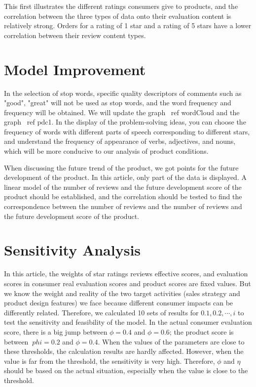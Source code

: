 \documentclass{mcmthesis}
\begin{document}
This first illustrates the different ratings consumers give to products, and the correlation between the three types of data onto their evaluation content is relatively strong. Orders for a rating of 1 star and a rating of 5 stars have a lower correlation between their review content types.
\section{Model Improvement}

In the selection of stop words, specific quality descriptors of comments such as "good", "great" will not be used as stop words, and the word frequency and frequency will be obtained. We will update the graph \ ref {wordCloud} and the graph \ ref {pdc1}. In the display of the problem-solving ideas, you can choose the frequency of words with different parts of speech corresponding to different stars, and understand the frequency of appearance of verbs, adjectives, and nouns, which will be more conducive to our analysis of product conditions.

When discussing the future trend of the product, we got points for the future development of the product. In this article, only part of the data is displayed. A linear model of the number of reviews and the future development score of the product should be established, and the correlation should be tested to find the correspondence between the number of reviews and the number of reviews and the future development score of the product. 

\section{Sensitivity Analysis}

In this article, the weights of star ratings reviews effective scores, and evaluation scores in consumer real evaluation scores and product scores are fixed values. But we know the weight and reality of the two target activities (sales strategy and product design features) we face because different consumer impacts can be differently
related. Therefore, we calculated 10 sets of results for $0.1,0.2, \cdots, i$ to test the sensitivity and feasibility of the model. In the actual consumer evaluation score, there is a big jump between $\phi = 0.4$ and $\phi = 0.6$; the product score is between $\ phi = 0.2$ and $\phi = 0.4$. When the values of the parameters are close to these thresholds, the calculation results are hardly affected. However, when the value is far from the threshold, the sensitivity is very high. Therefore, $\phi$ and $\eta$ should be based on the actual situation, especially when the value is close to the threshold.
\end{document}
